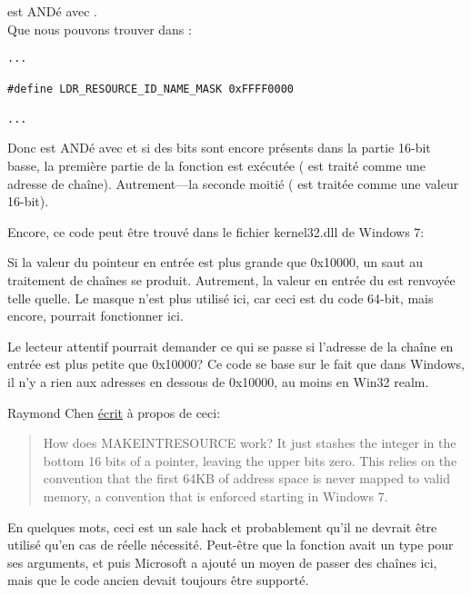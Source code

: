  est ANDé avec . \\
 Que nous pouvons trouver dans :

\begin{lstlisting}[style=customc]
...

#define LDR_RESOURCE_ID_NAME_MASK 0xFFFF0000

...
\end{lstlisting}

Donc  est ANDé avec  et si des bits sont encore présents
dans la partie 16-bit basse, la première partie de la fonction est exécutée ( 
est traité comme une adresse de chaîne).
Autrement---la seconde moitié ( est traitée comme une valeur 16-bit).

Encore, ce code peut être trouvé dans le fichier kernel32.dll de Windows 7:



Si la valeur du pointeur en entrée est plus grande que 0x10000, un saut au traitement
de chaînes se produit.
Autrement, la valeur en entrée du  est renvoyée telle quelle.
Le masque  n'est plus utilisé ici, car ceci est du code 64-bit, mais
encore,  pourrait fonctionner ici.

Le lecteur attentif pourrait demander ce qui se passe si l'adresse de la chaîne en
entrée est plus petite que 0x10000?
Ce code se base sur le fait que dans Windows, il n'y a rien aux adresses en dessous
de 0x10000, au moins en Win32 realm.

Raymond Chen \href{https://blogs.msdn.microsoft.com/oldnewthing/20130925-00/?p=3123}{écrit} à propos de ceci:

\begin{framed}
\begin{quotation}
How does MAKE­INT­RESOURCE work? It just stashes the integer in the bottom 16 bits of a pointer, leaving the upper bits zero. This relies on the convention that the first 64KB of address space is never mapped to valid memory, a convention that is enforced starting in Windows 7.
\end{quotation}
\end{framed}

En quelques mots, ceci est un sale hack et probablement qu'il ne devrait être utilisé
qu'en cas de réelle nécessité.
Peut-être que la fonction  avait un type  pour ses arguments,
et puis Microsoft a ajouté un moyen de passer des chaînes ici, mais que le code ancien
devait toujours être supporté.

